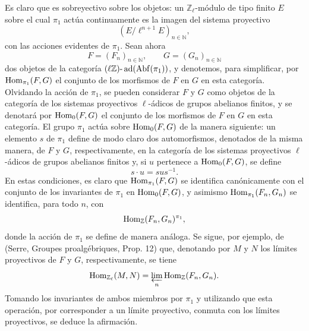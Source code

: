 \begin{prooftext}[Demostración]
Es claro que es sobreyectivo sobre los objetos: un \(\mathbb Z_\ell\)-módulo de tipo finito \(E\) sobre el cual \(\pi_1\) actúa continuamente es la imagen del sistema proyectivo
\[
(E/\ell^{n+1}E)_{n\in\mathbb N},
\]
con las acciones evidentes de \(\pi_1\). Sean ahora
\[
F=(F_n)_{n\in\mathbb N},\qquad G=(G_n)_{n\in\mathbb N}
\]
dos objetos de la categoría \((\ell\mathbb Z)\text{-}\operatorname{ad}(\operatorname{Abf}(\pi_1))\), y denotemos, para simplificar, por \(\operatorname{Hom}_{\pi_1}(F,G)\) el conjunto de los morfismos de \(F\) en \(G\) en esta categoría. Olvidando la acción de \(\pi_1\), se pueden considerar \(F\) y \(G\) como objetos de la categoría de los sistemas proyectivos \(\ell\)-ádicos de grupos abelianos finitos, y se denotará por \(\operatorname{Hom}_0(F,G)\) el conjunto de los morfismos de \(F\) en \(G\) en esta categoría. El grupo \(\pi_1\) actúa sobre \(\operatorname{Hom}_0(F,G)\) de la manera siguiente: un elemento \(s\) de \(\pi_1\) define de modo claro dos automorfismos, denotados de la misma manera, de \(F\) y \(G\), respectivamente, en la categoría de los sistemas proyectivos \(\ell\)-ádicos de grupos abelianos finitos y, si \(u\) pertenece a \(\operatorname{Hom}_0(F,G)\), se define
\[
s\cdot u=sus^{-1}.
\]
En estas condiciones, es claro que \(\operatorname{Hom}_{\pi_1}(F,G)\) se identifica canónicamente con el conjunto de los invariantes de \(\pi_1\) en \(\operatorname{Hom}_0(F,G)\), y asimismo \(\operatorname{Hom}_{\pi_1}(F_n,G_n)\) se identifica, para todo \(n\), con
\[
\operatorname{Hom}_{\mathbb Z}(F_n,G_n)^{\pi_1},
\]
donde la acción de \(\pi_1\) se define de manera análoga. Se sigue, por ejemplo, de (Serre, Groupes proalgébriques, Prop. 12) que, denotando por \(M\) y \(N\) los límites proyectivos de \(F\) y \(G\), respectivamente, se tiene
\[
\operatorname{Hom}_{\mathbb Z_\ell}(M,N)=\varprojlim_n\operatorname{Hom}_{\mathbb Z}(F_n,G_n).
\]
Tomando los invariantes de ambos miembros por \(\pi_1\) y utilizando que esta operación, por corresponder a un límite proyectivo, conmuta con los límites proyectivos, se deduce la afirmación.
\end{prooftext}
